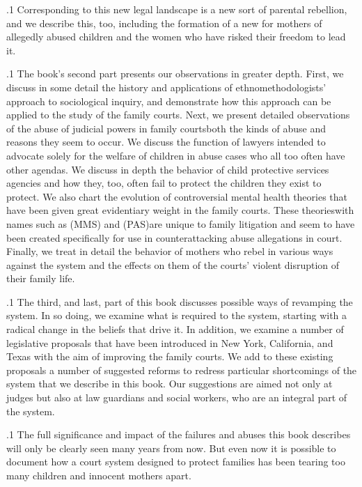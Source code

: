 \documentclass[11pt, twoside]{article}
\begin{document}
{\p.1{%
Corresponding to this new legal landscape is a new sort of parental
rebellion, and we describe this, too, including the formation of a new
 for mothers of allegedly abused children and
the women who have risked their freedom to lead it.
}%

\p.1{%
The book’s second part presents our observations in greater depth.
First, we discuss in some detail the history and applications of ethnomethodologists’ approach to sociological inquiry, and demonstrate
how this approach can be applied to the study of the family courts. Next,
we present detailed observations of the abuse of judicial powers in family
courts\mdash{}both the kinds of abuse and reasons they seem to occur. We discuss the function of  lawyers intended to advocate solely
for the welfare of children in abuse cases who all too often have other
agendas. We discuss in depth the behavior of child protective services
agencies and how they, too, often fail to protect the children they exist
to protect. We also chart the evolution of controversial mental health
theories that have been given great evidentiary weight in the family
courts. These theories\mdash{}with names such as  (MMS)
and  (PAS)\mdash{}are unique
to family litigation and seem to have been created specifically for use
in counterattacking abuse allegations in court. Finally, we treat in detail
the behavior of mothers who rebel in various ways against the system
and the effects on them of the courts’ violent disruption of their family
life.
}%

\p.1{%
The third, and last, part of this book discusses possible ways of
revamping the system. In so doing, we examine what is required to  the system, starting with a radical change in the beliefs that drive
it. In addition, we examine a number of legislative proposals that have
been introduced in New York, California, and Texas with the aim of improving the family courts. We add to these existing proposals a number
of suggested reforms to redress particular shortcomings of the system
that we describe in this book. Our suggestions are aimed not only at
judges but also at law guardians and social workers, who are an integral
part of the system.\enlargethispage{1em}
}%

\p.1{%
The full significance and impact of the failures and abuses this book
describes will only be clearly seen many years from now. But even now it
is possible to document how a court system designed to protect families
has been tearing too many children and innocent mothers apart.
}%





}
\end{document}
